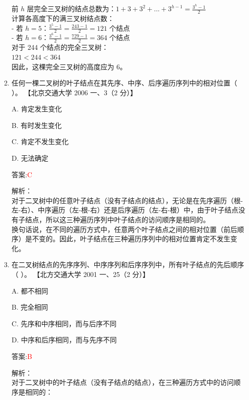 \documentclass[lang=cn,newtx,10pt,scheme=chinese]{../../../elegantbook}
\begin{document}
\begin{enumerate}
    前 $h$ 层完全三叉树的结点总数为：$1 + 3 + 3^2 + ... + 3^{h-1} = \frac{3^h-1}{2}$\\
    
    计算各高度下的满三叉树结点数：\\
    - 若 $h = 5$：$\frac{3^5-1}{2} = \frac{243-1}{2} = 121$ 个结点\\
    - 若 $h = 6$：$\frac{3^6-1}{2} = \frac{729-1}{2} = 364$ 个结点\\
    
    对于 244 个结点的完全三叉树：\\
    $121 < 244 < 364$\\
    
    因此，这棵完全三叉树的高度应为 6。

    \item 任何一棵二叉树的叶子结点在其先序、中序、后序遍历序列中的相对位置（ ）。  
    【北京交通大学 2006 一、3（2 分）】  

    A. 肯定发生变化  

    B. 有时发生变化  

    C. 肯定不发生变化  

    D. 无法确定  

    答案:\textcolor{red}{C}
    
    解析：\\
    对于二叉树中的任意叶子结点（没有子结点的结点），无论是在先序遍历（根-左-右）、中序遍历（左-根-右）还是后序遍历（左-右-根）中，由于叶子结点没有子结点，所以这三种遍历序列中叶子结点的访问顺序是相同的。\\
    
    换句话说，在不同的遍历方式中，任意两个叶子结点之间的相对位置（前后顺序）是不变的。因此，叶子结点在三种遍历序列中的相对位置肯定不发生变化。

    \item 在二叉树结点的先序序列、中序序列和后序序列中，所有叶子结点的先后顺序（ ）。  
    【北方交通大学 2001 一、25（2 分）】 

    A. 都不相同  

    B. 完全相同  

    C. 先序和中序相同，而与后序不同  

    D. 中序和后序相同，而与先序不同  

    答案:\textcolor{red}{B}
    
    解析：\\
    对于二叉树中的叶子结点（没有子结点的结点），在三种遍历方式中的访问顺序是相同的：\\
    

\end{enumerate}
\end{document}
